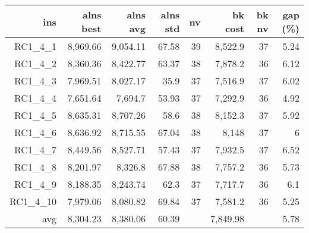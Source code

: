   \begin{table}[caption={Kết quả đo với tập HG\_RC\_1\_4 400 yêu cầu}, label=exp:HGRC14]
    \centering
    \begin{tabular}{rrrrrrrr}
    \hline
    ins & alns best & alns avg & alns std & nv & bk cost & bk nv & gap (\%) \\ \hline
    RC1\_4\_1 & 8,969.66 & 9,054.11 & 67.58 & 39 & 8,522.9 & 37 & 5.24 \\ \hline
    RC1\_4\_2 & 8,360.36 & 8,422.77 & 63.37 & 38 & 7,878.2 & 36 & 6.12 \\ \hline
    RC1\_4\_3 & 7,969.51 & 8,027.17 & 35.9 & 37 & 7,516.9 & 37 & 6.02 \\ \hline
    RC1\_4\_4 & 7,651.64 & 7,694.7 & 53.93 & 37 & 7,292.9 & 36 & 4.92 \\ \hline
    RC1\_4\_5 & 8,635.31 & 8,707.26 & 58.6 & 38 & 8,152.3 & 37 & 5.92 \\ \hline
    RC1\_4\_6 & 8,636.92 & 8,715.55 & 67.04 & 38 & 8,148 & 37 & 6 \\ \hline
    RC1\_4\_7 & 8,449.56 & 8,527.71 & 57.43 & 37 & 7,932.5 & 37 & 6.52 \\ \hline
    RC1\_4\_8 & 8,201.97 & 8,326.8 & 67.88 & 38 & 7,757.2 & 36 & 5.73 \\ \hline
    RC1\_4\_9 & 8,188.35 & 8,243.74 & 62.3 & 37 & 7,717.7 & 36 & 6.1 \\ \hline
    RC1\_4\_10 & 7,979.06 & 8,080.82 & 69.84 & 37 & 7,581.2 & 36 & 5.25 \\ \hline
    avg & 8,304.23 & 8,380.06 & 60.39 & & 7,849.98 & & 5.78 \\ \hline
    \end{tabular}
  \end{table}

